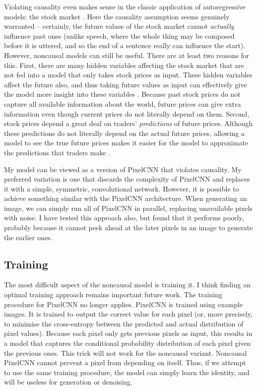 \documentclass[11pt, a4paper, openany]{book}
\begin{document}
Violating causality even makes sense in the classic application of autoregressive models: the stock market \citep{noncausaleco1}. Here the causality assumption seems genuinely warranted -- certainly, the future values of the stock market cannot \emph{actually} influence past ones (unlike speech, where the whole thing may be composed before it is uttered, and so the end of a sentence really can influence the start). However, noncausal models can still be useful. There are at least two reasons for this. First, there are many hidden variables affecting the stock market that are not fed into a model that only takes stock prices as input. These hidden variables affect the future also, and thus taking future values as input can effectively give the model more insight into these variables \citep{noncausaleco1}. Because past stock prices do not capture all available information about the world, future prices can give extra information even though current prices do not literally depend on them. Second, stock prices depend a great deal on traders' \emph{predictions} of future prices. Although these predictions do not literally depend on the actual future prices, allowing a model to see the true future prices makes it easier for the model to approximate the predictions that traders make \citep{noncausaleco1}.

My model can be viewed as a version of PixelCNN that violates causality. My preferred variation is one that discards the complexity of PixelCNN and replaces it with a simple, symmetric, convolutional network. However, it is possible to achieve something similar with the PixelCNN architecture. When generating an image, we can simply run all of PixelCNN in parallel, replacing unavailable pixels with noise. I have tested this approach also, but found that it performs poorly, probably because it cannot peek ahead at the later pixels in an image to generate the earlier ones.

\subsection{Training} \label{trainingsection}

The most difficult aspect of the noncausal model is training it. I think finding an optimal training approach remains important future work. The training procedure for PixelCNN no longer applies. PixelCNN is trained using example images. It is trained to output the correct value for each pixel (or, more precisely, to minimise the cross-entropy between the predicted and actual distribution of pixel values). Because each pixel only gets previous pixels as input, this results in a model that captures the conditional probability distribution of each pixel given the previous ones. This trick will not work for the noncausal variant. Noncausal PixelCNN cannot prevent a pixel from depending on itself. Thus, if we attempt to use the same training procedure, the model can simply learn the identity, and will be useless for generation or denoising.
\end{document}

